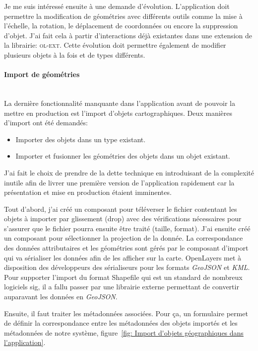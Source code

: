 \documentclass{rapportUHA40}
\begin{document}
Je me suis intéressé ensuite à une demande d'évolution. L'application doit
permettre la modification de géométries avec différents outils comme la mise à
l'échelle, la rotation, le déplacement de coordonnées ou encore la suppression
d'objet. J'ai fait cela à partir d'interactions déjà existantes dans une
extension de la librairie: \textsc{ol-ext}. Cette évolution doit permettre
également de modifier plusieurs objets à la fois et de types différents.

\paragraph{Import de géométries}\mbox{}\\
La dernière fonctionnalité manquante dans l'application avant de pouvoir la
mettre en production est l'import d'objets cartographiques. Deux manières d'import
ont été demandés:
\begin{itemize}
  \item Importer des objets dans un type existant.
  \item Importer et fusionner les géométries des objets dans un objet existant.
\end{itemize}

J'ai fait le choix de prendre de la dette technique en introduisant de la
complexité inutile afin de livrer une première version de l'application
rapidement car la présentation et mise en production étaient imminentes.

Tout d'abord, j'ai créé un composant pour téléverser le fichier contentant les
objets à importer par glissement (drop) avec des vérifications nécessaires pour
s'assurer que le fichier pourra ensuite être traité (taille, format). J'ai
ensuite créé un composant pour sélectionner la projection de la donnée. La
correspondance des données attributaires et les géométries sont gérés par le
composant d'import qui va sérialiser les données afin de les afficher sur la
carte. OpenLayers met à disposition des développeurs des sérialiseurs pour les
formats \textit{GeoJSON} et \textit{KML}. Pour supporter l'import du format
Shapefile qui est un standard de nombreux logiciels \gls{sig}, il a fallu
passer par une librairie externe permettant de convertir auparavant les données
en \textit{GeoJSON}.

Ensuite, il faut traiter les métadonnées associées. Pour ça, un formulaire
permet de définir la correspondance entre les métadonnées des objets importés
et les métadonnées de notre système, figure~\ref{fig: Import d'objets
  géographiques dans l'application}.
\end{document}
